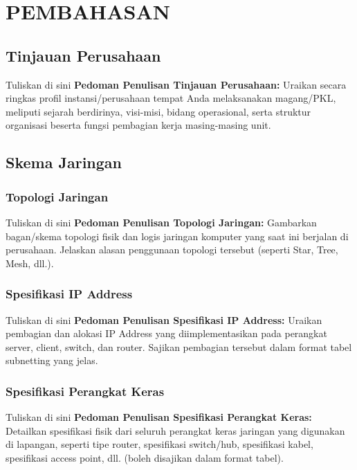 \chapter{PEMBAHASAN}
\section{Tinjauan Perusahaan}


Tuliskan di sini \textbf{Pedoman Penulisan Tinjauan Perusahaan:} Uraikan secara ringkas profil instansi/perusahaan tempat Anda melaksanakan magang/PKL, meliputi sejarah berdirinya, visi-misi, bidang operasional, serta struktur organisasi beserta fungsi pembagian kerja masing-masing unit.


\section{Skema Jaringan}

\subsection{Topologi Jaringan}


Tuliskan di sini \textbf{Pedoman Penulisan Topologi Jaringan:} Gambarkan bagan/skema topologi fisik dan logis jaringan komputer yang saat ini berjalan di perusahaan. Jelaskan alasan penggunaan topologi tersebut (seperti Star, Tree, Mesh, dll.).


\subsection{Spesifikasi IP Address}


Tuliskan di sini \textbf{Pedoman Penulisan Spesifikasi IP Address:} Uraikan pembagian dan alokasi IP Address yang diimplementasikan pada perangkat server, client, switch, dan router. Sajikan pembagian tersebut dalam format tabel subnetting yang jelas.


\subsection{Spesifikasi Perangkat Keras}


Tuliskan di sini \textbf{Pedoman Penulisan Spesifikasi Perangkat Keras:} Detailkan spesifikasi fisik dari seluruh perangkat keras jaringan yang digunakan di lapangan, seperti tipe router, spesifikasi switch/hub, spesifikasi kabel, spesifikasi access point, dll. (boleh disajikan dalam format tabel).


